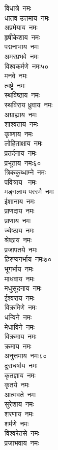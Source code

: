 \begin{multicols}{\maxColumns}
\begin{flushleft}
विधात्रे~नमः\\
धातव उत्तमाय~नमः\\
अप्रमेयाय~नमः\\
हृषीकेशाय~नमः\\
पद्मनाभाय~नमः\\
अमरप्रभवे~नमः\\
विश्वकर्मणे~नमः\hfill ५०\\
मनवे~नमः\\
त्वष्ट्रे~नमः\\
स्थविष्ठाय~नमः\\
स्थविराय ध्रुवाय~नमः\\
अग्राह्याय~नमः\\
शाश्वताय~नमः\\
कृष्णाय~नमः\\
लोहिताक्षाय~नमः\\
प्रतर्दनाय~नमः\\
प्रभूताय~नमः\hfill ६०\\
त्रिककुब्धाम्ने~नमः\\
पवित्राय ~नमः\\
मङ्गलाय परस्मै~नमः\\
ईशानाय~नमः\\
प्राणदाय~नमः\\
प्राणाय~नमः\\
ज्येष्ठाय~नमः\\
श्रेष्ठाय~नमः\\
प्रजापतये~नमः\\
हिरण्यगर्भाय~नमः\hfill ७०\\
भूगर्भाय~नमः\\
माधवाय~नमः\\
मधुसूदनाय~नमः\\
ईश्वराय~नमः\\
विक्रमिणे~नमः\\
धन्विने~नमः\\
मेधाविने~नमः\\
विक्रमाय~नमः\\
क्रमाय~नमः\\
अनुत्तमाय~नमः\hfill ८०\\
दुराधर्षाय~नमः\\
कृतज्ञाय~नमः\\
कृतये~नमः\\
आत्मवते~नमः\\
सुरेशाय~नमः\\
शरणाय~नमः\\
शर्मणे~नमः\\
विश्वरेतसे~नमः\\
प्रजाभवाय~नमः\\

\end{flushleft}
\end{multicols}
